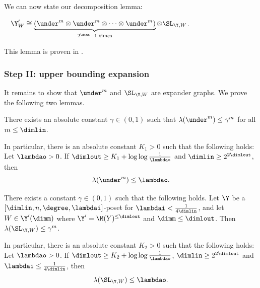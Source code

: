 We can now state our decomposition lemma:
\begin{lemma}\label{lem:grassmannian-link-decomposition}~
  \(\Y'_W \cong \underbrace{(\under^m \otimes \under^m \otimes \dots \otimes \under^m)}_{2^\dimm -1 \text{ times}} \otimes \SL_{\Y,W}\).
\end{lemma}
This lemma is proven in .
%

\subsubsection{Step II: upper bounding expansion}
It remains to show that \(\under^m\) and \(\SL_{\Y,W}\) are expander graphs. We prove the following two lemmas.

\begin{lemma} \label{lem:complete-part-analysis}
There exists an absolute constant \(\gamma \in (0,1)\) such that 
    \(\lambda(\under^m) \leq \gamma^{m}\) for all \(m \leq \dimlin\).
    
    In particular, there is an absolute constant \(K_1 > 0\) such that the following holds: Let \(\lambdao > 0\). If \(\dimlout \geq K_1 + \log \log \frac{1}{\lambdao}\) and \(\dimlin \geq 2^{2 \dimlout}\), then
    \[\lambda(\under^m) \leq \lambdao.\]
\end{lemma}

\begin{lemma} \label{lem:loc-to-glob-decomp-of-link}
There exists a constant \(\gamma  \in (0,1)\) such that the following holds. Let \(\Y\) be a \([\dimlin,n,\degree,\lambdai]\)-poset for \(\lambdai < \frac{1}{4\dimlin}\), and let \(W \in \Y'(\dimm)\) where \(\Y'=\M(Y)^{\leq \dimlout}\) and \(\dimm \leq \dimlout\). Then
    \(\lambda(\SL_{\Y,W}) \leq \gamma^{m}\). %
    
    In particular, there is an absolute constant \(K_2 >0\) such that the following holds: Let \(\lambdao > 0\). If \(\dimlout \geq K_2 + \log \log \frac{1}{\lambdao}\), \(\dimlin \geq 2^{2\dimlout}\) and \(\lambdai \leq \frac{1}{4\dimlin}\), then
    \[\lambda(\SL_{\Y,W}) \leq \lambdao.\]
\end{lemma}

